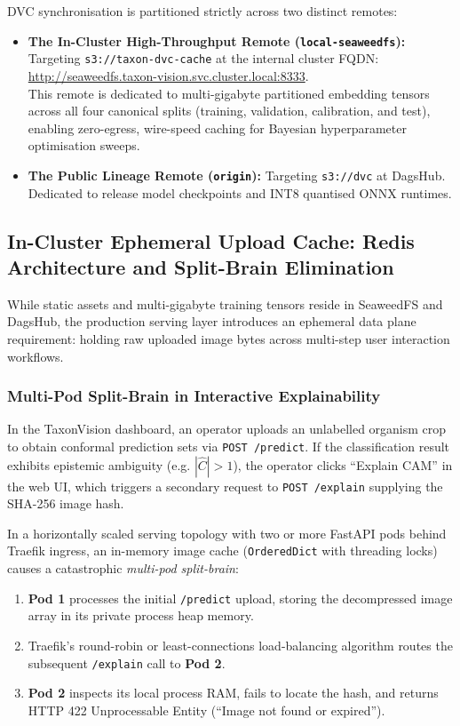 DVC synchronisation is partitioned strictly across two distinct remotes:
\begin{itemize}
    \item \textbf{The In-Cluster High-Throughput Remote (\texttt{local-seaweedfs}):}\\
    Targeting \nolinkurl{s3://taxon-dvc-cache} at the internal cluster FQDN:\\
    \url{http://seaweedfs.taxon-vision.svc.cluster.local:8333}.\\
    This remote is dedicated to multi-gigabyte partitioned embedding tensors across all four canonical splits (training, validation, calibration, and test), enabling zero-egress, wire-speed caching for Bayesian hyperparameter optimisation sweeps.
    \item \textbf{The Public Lineage Remote (\texttt{origin}):} Targeting \nolinkurl{s3://dvc} at DagsHub. Dedicated to release model checkpoints and INT8 quantised ONNX runtimes.
\end{itemize}

\subsection{In-Cluster Ephemeral Upload Cache: Redis Architecture and Split-Brain Elimination}
\label{sec:redis_upload_cache}

While static assets and multi-gigabyte training tensors reside in SeaweedFS and DagsHub, the production serving layer introduces an ephemeral data plane requirement: holding raw uploaded image bytes across multi-step user interaction workflows.

\subsubsection{Multi-Pod Split-Brain in Interactive Explainability}
In the TaxonVision dashboard, an operator uploads an unlabelled organism crop to obtain conformal prediction sets via \texttt{POST /predict}. If the classification result exhibits epistemic ambiguity (e.g. $|\hat{C}| > 1$), the operator clicks ``Explain CAM'' in the web UI, which triggers a secondary request to \texttt{POST /explain} supplying the SHA-256 image hash.

In a horizontally scaled serving topology with two or more FastAPI pods behind Traefik ingress, an in-memory image cache (\texttt{OrderedDict} with threading locks) causes a catastrophic \textit{multi-pod split-brain}:
\begin{enumerate}
    \item \textbf{Pod 1} processes the initial \texttt{/predict} upload, storing the decompressed image array in its private process heap memory.
    \item Traefik's round-robin or least-connections load-balancing algorithm routes the subsequent \texttt{/explain} call to \textbf{Pod 2}.
    \item \textbf{Pod 2} inspects its local process RAM, fails to locate the hash, and returns HTTP 422 Unprocessable Entity (``Image not found or expired'').
\end{enumerate}

